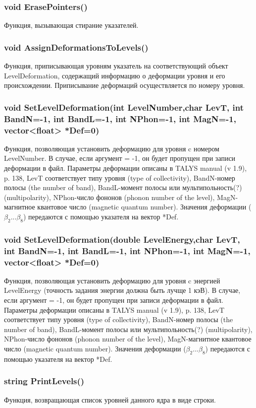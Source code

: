 \documentclass[a4paper,12pt]{extarticle}
\begin{document}
\subsubsection{void ErasePointers()}
Функция, вызывающая стирание указателей.
\subsubsection{void AssignDeformationsToLevels()}
Функция, приписывающая уровням указатель на соответствующий объект LevelDeformation, содержащий информацию о деформации уровня и его происхождении. Приписывание деформаций осуществляется по номеру уровня.
\subsubsection{void SetLevelDeformation(int LevelNumber,char LevT, int BandN=-1, int BandL=-1, int NPhon=-1, int MagN=-1, vector<float> *Def=0)}
Функция, позволяющая установить деформацию для уровня c номером LevelNumber. В случае, если аргумент = -1, он будет пропущен при записи деформации в файл. Параметры деформации описаны в TALYS manual (v 1.9), p. 138, LevT соответствует типу уровня (type of collectivity), BandN-номер полосы (the number of band), BandL-момент полосы или мультипольность(?) (multipolarity), NPhon-число фононов (phonon number of the level), MagN-магнитное квантовое число (magnetic quantum number). Значения деформации ($\beta_2...\beta_8$) передаются с помощью указателя на вектор *Def.
\subsubsection{void SetLevelDeformation(double LevelEnergy,char LevT, int BandN=-1, int BandL=-1, int NPhon=-1, int MagN=-1, vector<float> *Def=0)}
Функция, позволяющая установить деформацию для уровня c энергией LevelEnergy (точность задания энергии должна быть лучще 1 кэВ). В случае, если аргумент = -1, он будет пропущен при записи деформации в файл. Параметры деформации описаны в TALYS manual (v 1.9), p. 138, LevT соответствует типу уровня (type of collectivity), BandN-номер полосы (the number of band), BandL-момент полосы или мультипольность(?) (multipolarity), NPhon-число фононов (phonon number of the level), MagN-магнитное квантовое число (magnetic quantum number). Значения деформации ($\beta_2...\beta_8$) передаются с помощью указателя на вектор *Def.
\subsubsection{string PrintLevels()}
Функция, возвращающая список уровней данного ядра в виде строки.
\end{document}
